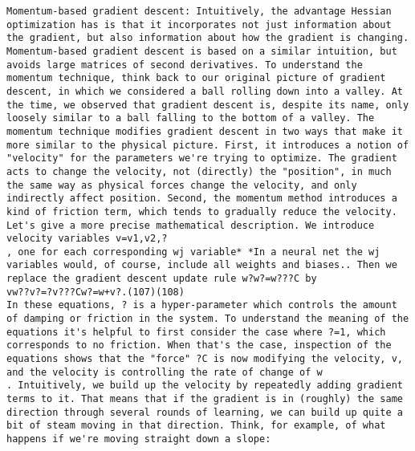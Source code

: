 \begin{lstlisting}
Momentum-based gradient descent: Intuitively, the advantage Hessian optimization has is that it incorporates not just information about the gradient, but also information about how the gradient is changing. Momentum-based gradient descent is based on a similar intuition, but avoids large matrices of second derivatives. To understand the momentum technique, think back to our original picture of gradient descent, in which we considered a ball rolling down into a valley. At the time, we observed that gradient descent is, despite its name, only loosely similar to a ball falling to the bottom of a valley. The momentum technique modifies gradient descent in two ways that make it more similar to the physical picture. First, it introduces a notion of "velocity" for the parameters we're trying to optimize. The gradient acts to change the velocity, not (directly) the "position", in much the same way as physical forces change the velocity, and only indirectly affect position. Second, the momentum method introduces a kind of friction term, which tends to gradually reduce the velocity.
Let's give a more precise mathematical description. We introduce velocity variables v=v1,v2,?
, one for each corresponding wj variable* *In a neural net the wj variables would, of course, include all weights and biases.. Then we replace the gradient descent update rule w?w?=w???C by 
vw??v?=?v???Cw?=w+v?.(107)(108)
In these equations, ? is a hyper-parameter which controls the amount of damping or friction in the system. To understand the meaning of the equations it's helpful to first consider the case where ?=1, which corresponds to no friction. When that's the case, inspection of the equations shows that the "force" ?C is now modifying the velocity, v, and the velocity is controlling the rate of change of w
. Intuitively, we build up the velocity by repeatedly adding gradient terms to it. That means that if the gradient is in (roughly) the same direction through several rounds of learning, we can build up quite a bit of steam moving in that direction. Think, for example, of what happens if we're moving straight down a slope:


\end{lstlisting}
